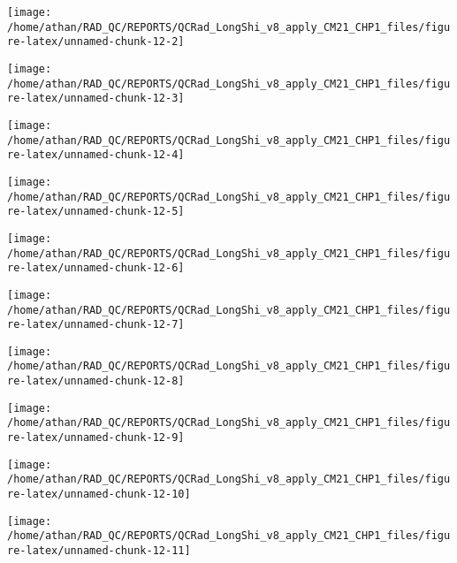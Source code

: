 \documentclass[
  10pt,
  a4paper,oneside]{article}
\begin{document}
\begin{center}\texttt{[image: /home/athan/RAD\_QC/REPORTS/QCRad\_LongShi\_v8\_apply\_CM21\_CHP1\_files/figure-latex/unnamed-chunk-12-2]} \end{center}

\begin{center}\texttt{[image: /home/athan/RAD\_QC/REPORTS/QCRad\_LongShi\_v8\_apply\_CM21\_CHP1\_files/figure-latex/unnamed-chunk-12-3]} \end{center}

\begin{center}\texttt{[image: /home/athan/RAD\_QC/REPORTS/QCRad\_LongShi\_v8\_apply\_CM21\_CHP1\_files/figure-latex/unnamed-chunk-12-4]} \end{center}

\begin{center}\texttt{[image: /home/athan/RAD\_QC/REPORTS/QCRad\_LongShi\_v8\_apply\_CM21\_CHP1\_files/figure-latex/unnamed-chunk-12-5]} \end{center}

\begin{center}\texttt{[image: /home/athan/RAD\_QC/REPORTS/QCRad\_LongShi\_v8\_apply\_CM21\_CHP1\_files/figure-latex/unnamed-chunk-12-6]} \end{center}

\begin{center}\texttt{[image: /home/athan/RAD\_QC/REPORTS/QCRad\_LongShi\_v8\_apply\_CM21\_CHP1\_files/figure-latex/unnamed-chunk-12-7]} \end{center}

\begin{center}\texttt{[image: /home/athan/RAD\_QC/REPORTS/QCRad\_LongShi\_v8\_apply\_CM21\_CHP1\_files/figure-latex/unnamed-chunk-12-8]} \end{center}

\begin{center}\texttt{[image: /home/athan/RAD\_QC/REPORTS/QCRad\_LongShi\_v8\_apply\_CM21\_CHP1\_files/figure-latex/unnamed-chunk-12-9]} \end{center}

\begin{center}\texttt{[image: /home/athan/RAD\_QC/REPORTS/QCRad\_LongShi\_v8\_apply\_CM21\_CHP1\_files/figure-latex/unnamed-chunk-12-10]} \end{center}

\begin{center}\texttt{[image: /home/athan/RAD\_QC/REPORTS/QCRad\_LongShi\_v8\_apply\_CM21\_CHP1\_files/figure-latex/unnamed-chunk-12-11]} \end{center}
\end{document}
